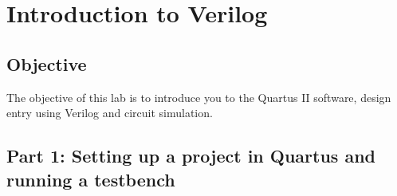 \chapter{Introduction to Verilog}
\label{introductionToVerilog}
\graphicspath{ {./Lab01SimpleVerilog/Fig} }


\hypertarget{objective}{%
\section{\texorpdfstring{Objective }{Objective }}\label{objective}}

The objective of this lab is to introduce you to the Quartus II
software, design entry using Verilog and circuit simulation.


\hypertarget{part-1-setting-up-a-project-in-quartus-and-running-a-testbench}{%
\section{Part 1: Setting up a project in Quartus and running a testbench}
\label{part-1-setting-up-a-project-in-quartus-and-running-a-testbench}}

